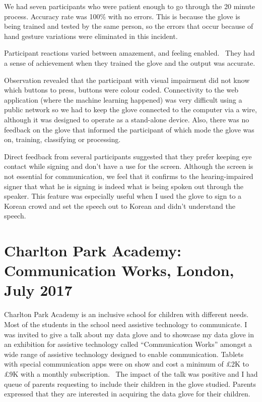 We had seven participants who were patient enough to go through the 20 minute process. Accuracy rate was 100\% with no errors. This is because the glove is being trained and tested by the same person, so the errors that occur because of hand gesture variations were eliminated in this incident.  

Participant reactions varied between amazement, and feeling enabled.  They had a sense of achievement when they trained the glove and the output was accurate. 

Observation revealed that the participant with visual impairment did not know which buttons to press, buttons were colour coded. Connectivity to the web application (where the machine learning happened) was very difficult using a public network so we had to keep the glove connected to the computer via a wire, although it was designed to operate as a stand-alone device. Also, there was no feedback on the glove that informed the participant of which mode the glove was on, training, classifying or processing.

Direct feedback from several participants suggested that they prefer keeping eye contact while signing and don’t have a use for the screen. Although the screen is not essential for communication, we feel that it confirms to the hearing-impaired signer that what he is signing is indeed what is being spoken out through the speaker. This feature was especially useful when I used the glove to sign to a Korean crowd and set the speech out to Korean and didn’t understand the speech. 

\section{Charlton Park Academy: Communication Works, London, July 2017}

Charlton Park Academy is an inclusive school for children with different needs. Most of the students in the school need assistive technology to communicate. I was invited to give a talk about my data glove and to showcase my data glove in an exhibition for assistive technology called ``Communication Works'' amongst a wide range of assistive technology designed to enable communication. Tablets with special communication apps were on show and cost a minimum of £2K to £9K with a monthly subscription.  The impact of the talk was positive and I had queue of parents requesting to include their children in the glove studied. Parents expressed that they are interested in acquiring the data glove for their children. 


